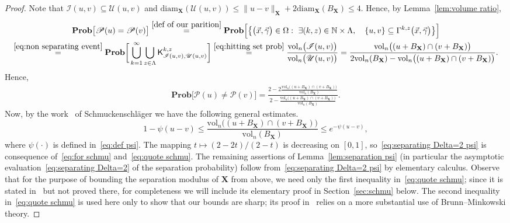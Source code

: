 \documentclass[11pt,reqno]{amsart}
\renewcommand{\le}{\leqslant}
\newcommand{\diam}{\mathrm{diam}}
\newcommand{\X}{\mathbf X}
\theoremstyle{remark}
\renewcommand{\subset}{\subseteq}
\newcommand{\N}{\mathbb N}
\renewcommand{\Pr}{\mathbf{Prob}}
\newcommand{\vol}{\mathrm{vol}}
\renewcommand{\1}{\mathbf 1}
\newcommand{\Part}{\mathscr{P}}
\begin{document}
\begin{proof}
Note that $\mathscr{I}(u,v)\subset \mathscr{U}(u,v)$ and $\diam_{\X}(\mathscr{U}(u,v))\le \|u-v\|_{\X}+2\diam_{\X}(B_{\X})\le 4$. Hence, by Lemma~\ref{lem:volume ratio},
\begin{multline*}
\Pr\big[\Part(u)=\Part(v)\big]\stackrel{\eqref{def of our parition}}{=}\Pr\Big[\big\{\big(\vec{x},\vec{\gamma}\big)\in \Omega:\ \exists (k,z)\in \N\times \Lambda,\quad \{u,v\}\subset \Gamma^{k,z}\big(\vec{x},\vec{\gamma}\big)\big\}\Big]\\\stackrel{\eqref{eq:non separating event}}{=}\Pr\bigg[\bigcup_{k=1}^\infty\bigcup_{z\in \Lambda}\mathsf{K}^{k,z}_{\mathscr{I}(u,v),\mathscr{U}(u,v)}\bigg]\stackrel{\eqref{eq:hitting set prob}}{=}\frac{\vol_n\big(\mathscr{I}(u,v)\big)}{\vol_n\big(\mathscr{U}(u,v)\big)}
=\frac{\vol_n\big((u+B_{\X})\cap (v+B_{\X})\big)}{2\vol_n(B_{\X})-\vol_n\big((u+B_{\X})\cap (v+B_{\X})\big)}.
\end{multline*}
Hence,
\begin{align}\label{eq:for schmu}
\Pr\big[\Part(u)\neq\Part(v)\big]=\frac{2-2\frac{\vol_n\big((u+B_{\X})\cap (v+B_{\X})\big)}{\vol_n(B_{\X})}}{2-\frac{\vol_n\big((u+B_{\X})\cap (v+B_{\X})\big)}{\vol_n(B_{\X})}}.
\end{align}
Now, by the work~\cite[Corollary~1]{Scm92} of Schmuckenschl\"ager  we have the following general estimates.
\begin{equation}\label{eq:quote schmu}
1-\psi(u-v)\le \frac{\vol_n\big((u+B_{\X})\cap (v+B_{\X})\big)}{\vol_n(B_{\X})}\le e^{-\psi(u-v)},
\end{equation}
where $\psi(\cdot)$ is defined in~\eqref{eq:def psi}. The mapping $t\mapsto (2-2t)/(2-t)$ is decreasing on $[0,1]$, so~\eqref{eq:separating Delta=2 psi} is consequence of~\eqref{eq:for schmu} and~\eqref{eq:quote schmu}. The remaining assertions of Lemma~\ref{lem:separation psi} (in particular the asymptotic evaluation~\eqref{eq:separating Delta=2} of the separation probability) follow from~\eqref{eq:separating Delta=2 psi} by elementary calculus.  Observe that for the purpose of bounding the separation modulus of $\X$ from above, we need only the first inequality in~\eqref{eq:quote schmu}; since it is stated in~\cite{Scm92} but not proved there, for completeness we will include its elementary proof  in Section~\ref{sec:schmu} below. The second inequality in~\eqref{eq:quote schmu} is used here only to show that our bounds are sharp; its proof in~\cite{Scm92} relies on a more substantial use of Brunn--Minkowski theory.






\end{proof}
\end{document}
